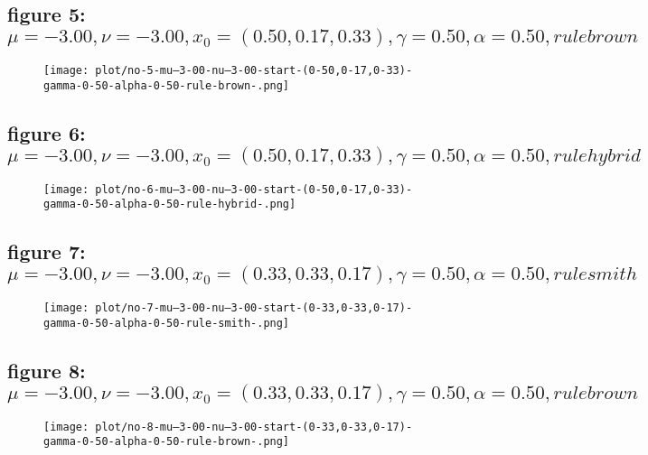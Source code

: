 \documentclass[a4paper]{article}
\begin{document}
\begin{multicols*}{2}
   \subsection{figure 5: \(\mu = -3.00, \nu = -3.00, x_0 = (0.50,0.17,0.33), \gamma = 0.50, \alpha = 0.50, rule brown\)}
   

   \begin{figure}[H]
   \centering
   \texttt{[image: plot/no-5-mu--3-00-nu--3-00-start-(0-50,0-17,0-33)-gamma-0-50-alpha-0-50-rule-brown-.png]}
   \end{figure}
   

   \subsection{figure 6: \(\mu = -3.00, \nu = -3.00, x_0 = (0.50,0.17,0.33), \gamma = 0.50, \alpha = 0.50, rule hybrid\)}
   

   \begin{figure}[H]
   \centering
   \texttt{[image: plot/no-6-mu--3-00-nu--3-00-start-(0-50,0-17,0-33)-gamma-0-50-alpha-0-50-rule-hybrid-.png]}
   \end{figure}
   

   \subsection{figure 7: \(\mu = -3.00, \nu = -3.00, x_0 = (0.33,0.33,0.17), \gamma = 0.50, \alpha = 0.50, rule smith\)}
   

   \begin{figure}[H]
   \centering
   \texttt{[image: plot/no-7-mu--3-00-nu--3-00-start-(0-33,0-33,0-17)-gamma-0-50-alpha-0-50-rule-smith-.png]}
   \end{figure}
   

   \subsection{figure 8: \(\mu = -3.00, \nu = -3.00, x_0 = (0.33,0.33,0.17), \gamma = 0.50, \alpha = 0.50, rule brown\)}
   

   \begin{figure}[H]
   \centering
   \texttt{[image: plot/no-8-mu--3-00-nu--3-00-start-(0-33,0-33,0-17)-gamma-0-50-alpha-0-50-rule-brown-.png]}
   \end{figure}
   
%
   \end{multicols*}
   
\end{document}
